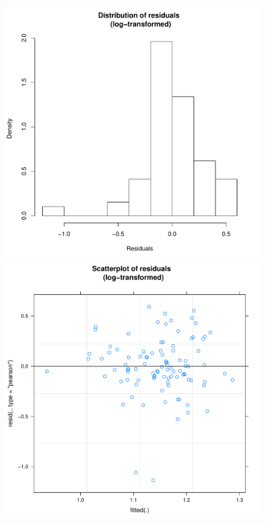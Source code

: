 \begin{CJK}{UTF8}{gbsn}


      \begin{figure}[!htbp]
        \includegraphics[scale =.4]{images/MLM23bLogHist.pdf}
        \includegraphics[scale =.4]{images/MLM23bLogScatter.pdf}

\end{figure}
\end{CJK}
